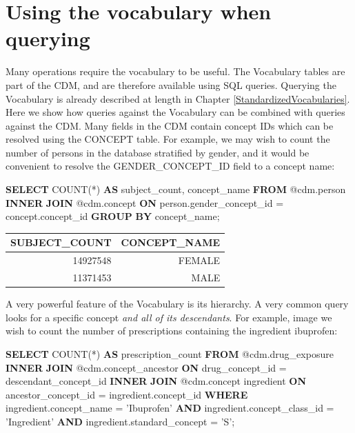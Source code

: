 \documentclass[11pt]{book}
\newenvironment{Shaded}{\begin{snugshade}}{\end{snugshade}}
\newcommand{\KeywordTok}[1]{\textcolor[rgb]{0.13,0.29,0.53}{\textbf{#1}}}
\newcommand{\StringTok}[1]{\textcolor[rgb]{0.31,0.60,0.02}{#1}}
\newcommand{\FunctionTok}[1]{\textcolor[rgb]{0.00,0.00,0.00}{#1}}
\newcommand{\NormalTok}[1]{#1}
\begin{document}
\section{Using the vocabulary when
querying}\label{using-the-vocabulary-when-querying}

Many operations require the vocabulary to be useful. The Vocabulary
tables are part of the CDM, and are therefore available using SQL
queries. Querying the Vocabulary is already described at length in
Chapter \ref{StandardizedVocabularies}. Here we show how queries against
the Vocabulary can be combined with queries against the CDM. Many fields
in the CDM contain concept IDs which can be resolved using the CONCEPT
table. For example, we may wish to count the number of persons in the
database stratified by gender, and it would be convenient to resolve the
GENDER\_CONCEPT\_ID field to a concept name:

\begin{Shaded}
\begin{Highlighting}[]
\KeywordTok{SELECT} \FunctionTok{COUNT}\NormalTok{(*) }\KeywordTok{AS}\NormalTok{ subject_count,}
\NormalTok{  concept_name}
\KeywordTok{FROM}\NormalTok{ @cdm.person}
\KeywordTok{INNER} \KeywordTok{JOIN}\NormalTok{ @cdm.concept}
  \KeywordTok{ON}\NormalTok{ person.gender_concept_id = concept.concept_id}
\KeywordTok{GROUP} \KeywordTok{BY}\NormalTok{ concept_name;}
\end{Highlighting}
\end{Shaded}

\begin{longtable}[]{@{}rr@{}}
\toprule
SUBJECT\_COUNT & CONCEPT\_NAME\tabularnewline
\midrule
\endhead
14927548 & FEMALE\tabularnewline
11371453 & MALE\tabularnewline
\bottomrule
\end{longtable}

A very powerful feature of the Vocabulary is its hierarchy. A very
common query looks for a specific concept \emph{and all of its
descendants}. For example, image we wish to count the number of
prescriptions containing the ingredient ibuprofen:

\begin{Shaded}
\begin{Highlighting}[]
\KeywordTok{SELECT} \FunctionTok{COUNT}\NormalTok{(*) }\KeywordTok{AS}\NormalTok{ prescription_count}
\KeywordTok{FROM}\NormalTok{ @cdm.drug_exposure}
\KeywordTok{INNER} \KeywordTok{JOIN}\NormalTok{ @cdm.concept_ancestor}
  \KeywordTok{ON}\NormalTok{ drug_concept_id = descendant_concept_id}
\KeywordTok{INNER} \KeywordTok{JOIN}\NormalTok{ @cdm.concept ingredient}
  \KeywordTok{ON}\NormalTok{ ancestor_concept_id = ingredient.concept_id}
\KeywordTok{WHERE}\NormalTok{ ingredient.concept_name = }\StringTok{'Ibuprofen'}
  \KeywordTok{AND}\NormalTok{ ingredient.concept_class_id = }\StringTok{'Ingredient'}
  \KeywordTok{AND}\NormalTok{ ingredient.standard_concept = }\StringTok{'S'}\NormalTok{;}
\end{Highlighting}
\end{Shaded}
\end{document}
